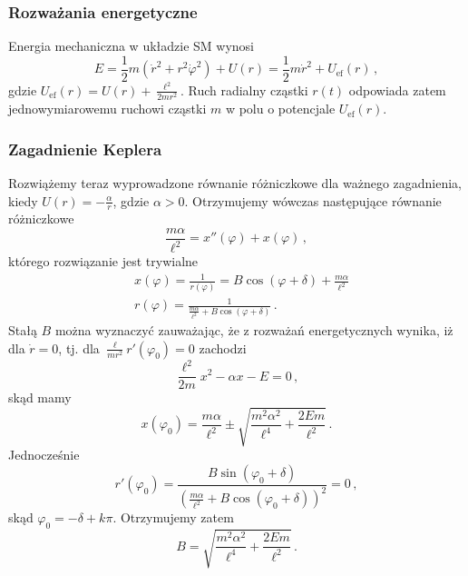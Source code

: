 \documentclass[../main.tex]{subfiles}
\begin{document}
\subsubsection{Rozważania energetyczne}
Energia mechaniczna w układzie SM wynosi
\begin{equation*}
    E=\frac{1}{2}m(\dot{r}^2+r^2\dot{\varphi}^2)+U(r)=\frac{1}{2}m\dot{r}^2+U_\text{ef}(r)\,,
\end{equation*}
gdzie \(U_\text{ef}(r)=U(r)+\frac{\ell^2}{2mr^2}\). Ruch radialny cząstki \(r(t)\) odpowiada zatem jednowymiarowemu ruchowi cząstki \(m\) w polu o potencjale \(U_\text{ef}(r)\).
\subsubsection{Zagadnienie Keplera}
Rozwiążemy teraz wyprowadzone równanie różniczkowe dla ważnego zagadnienia, kiedy \(U(r)=-\frac{\alpha}{r}\), gdzie \(\alpha>0\). Otrzymujemy wówczas następujące równanie różniczkowe
\begin{equation*}
    \frac{m\alpha}{\ell^2}=x''(\varphi)+x(\varphi)\,,
\end{equation*}
którego rozwiązanie jest trywialne
\begin{equation*}
\begin{split}
     &x(\varphi)=\frac{1}{r(\varphi)}=B\cos(\varphi+\delta)+\frac{m\alpha}{\ell^2}\\
     &r(\varphi)=\frac{1}{\frac{m\alpha}{\ell^2}+B\cos(\varphi+\delta)}\,.
\end{split}
\end{equation*}
Stałą \(B\) można wyznaczyć zauważając, że z rozważań energetycznych wynika, iż dla \(\dot r=0\), tj. dla \(\frac{\ell}{mr^2}r'(\varphi_0)=0\) zachodzi
\begin{equation*}
    \frac{\ell^2}{2m}x^2-\alpha x-E=0\,,
\end{equation*}
skąd mamy
\begin{equation*}
    x(\varphi_0)=\frac{m\alpha}{\ell^2}\pm\sqrt{\frac{m^2\alpha^2}{\ell^4}+\frac{2Em}{\ell^2}}\,.
\end{equation*}
Jednocześnie 
\begin{equation*}
    r'(\varphi_0)=\frac{B\sin(\varphi_0+\delta)}{\left(\frac{m\alpha}{\ell^2}+B\cos(\varphi_0+\delta)\right)^2}=0\,,
\end{equation*}
skąd \(\varphi_0=-\delta+k\pi\). Otrzymujemy zatem
\begin{equation*}
    B=\sqrt{\frac{m^2\alpha^2}{\ell^4}+\frac{2Em}{\ell^2}}\,.
\end{equation*}
\end{document}
